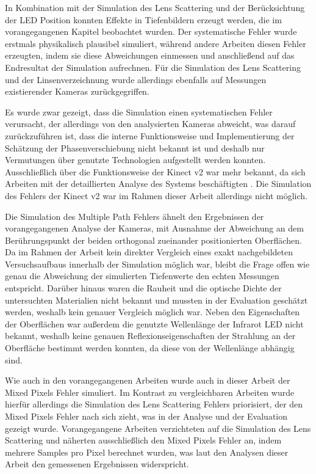 \documentclass[thesis.tex]{subfiles}
\begin{document}
In Kombination mit der Simulation des Lens Scattering und der Berücksichtung der LED Position konnten Effekte in Tiefenbildern erzeugt werden, die im vorangegangenen Kapitel beobachtet wurden. Der systematische Fehler wurde erstmals physikalisch plausibel simuliert, während andere Arbeiten diesen Fehler erzeugten, indem sie diese Abweichungen einmessen und anschließend auf das Endresultat der Simulation aufrechnen. Für die Simulation des Lens Scattering und der Linsenverzeichnung wurde allerdings ebenfalls auf Messungen existierender Kameras zurückgegriffen.

Es wurde zwar gezeigt, dass die Simulation einen systematischen Fehler verursacht, der allerdings von den analysierten Kameras abweicht, was darauf zurückzuführen ist, dass die interne Funktionsweise und Implementierung der Schätzung der Phasenverschiebung nicht bekannt ist und deshalb nur Vermutungen über genutzte Technologien aufgestellt werden konnten. Ausschließlich über die Funktionsweise der Kinect v2 war mehr bekannt, da sich Arbeiten mit der detaillierten Analyse des Systems beschäftigten \cite{bib:Giancola2018}. Die Simulation des Fehlers der Kinect v2 war im Rahmen dieser Arbeit allerdings nicht möglich.

Die Simulation des Multiple Path Fehlers ähnelt den Ergebnissen der vorangegangenen Analyse der Kameras, mit Ausnahme der Abweichung an dem Berührungspunkt der beiden orthogonal zueinander positionierten Oberflächen. Da im Rahmen der Arbeit kein direkter Vergleich eines exakt nachgebildeten Versuchsaufbaus innerhalb der Simulation möglich war, bleibt die Frage offen wie genau die Abweichung der simulierten Tiefenwerte den echten Messungen entspricht. Darüber hinaus waren die Rauheit und die optische Dichte der untersuchten Materialien nicht bekannt und mussten in der Evaluation geschätzt werden, weshalb kein genauer Vergleich möglich war. Neben den Eigenschaften der Oberflächen war außerdem die genutzte Wellenlänge der Infrarot LED nicht bekannt, weshalb keine genauen Reflexionseigenschaften der Strahlung an der Oberfläche bestimmt werden konnten, da diese von der Wellenlänge abhängig sind.

Wie auch in den vorangegangenen Arbeiten wurde auch in dieser Arbeit der Mixed Pixels Fehler simuliert. Im Kontrast zu vergleichbaren Arbeiten wurde hierfür allerdings die Simulation des Lens Scattering Fehlers priorisiert, der den Mixed Pixels Fehler nach sich zieht, was in der Analyse und der Evaluation gezeigt wurde. Vorangegangene Arbeiten verzichteten auf die Simulation des Lens Scattering und näherten ausschließlich den Mixed Pixels Fehler an, indem mehrere Samples pro Pixel berechnet wurden, was laut den Analysen dieser Arbeit den gemessenen Ergebnissen widerspricht.
\end{document}
